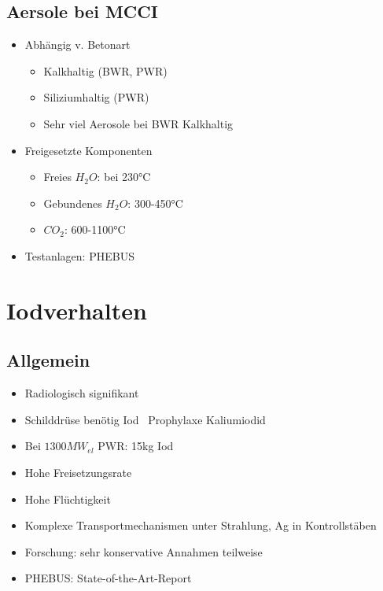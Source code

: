 \documentclass[12pt]{article}
\begin{document}
\subsection{Aersole bei MCCI}
\begin{itemize}
  \item Abhängig v. Betonart
  \begin{itemize}
    \item Kalkhaltig (BWR, PWR)
    \item Siliziumhaltig (PWR)
    \item Sehr viel Aerosole bei BWR Kalkhaltig
  \end{itemize}
  \item Freigesetzte Komponenten
  \begin{itemize}
    \item Freies \(H_2O\): bei 230°C
    \item Gebundenes \(H_2O\): 300-450°C
    \item \(CO_2\): 600-1100°C
  \end{itemize}
  \item Testanlagen: PHEBUS
\end{itemize}

\section{Iodverhalten}

\subsection{Allgemein}
\begin{itemize}
  \item Radiologisch signifikant
  \item Schilddrüse benötig Iod \textrightarrow\ Prophylaxe Kaliumiodid
  \item Bei \(1300 MW_{el}\) PWR: 15kg Iod
  \item Hohe Freisetzungsrate
  \item Hohe Flüchtigkeit
  \item Komplexe Transportmechanismen unter Strahlung, Ag in Kontrollstäben
  \item Forschung: sehr konservative Annahmen teilweise
  \item PHEBUS: State-of-the-Art-Report
\end{itemize}
\end{document}
